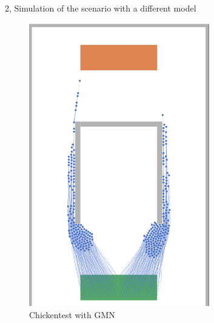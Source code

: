 \documentclass[10pt,a4paper]{article}
\begin{document}
\begin{task}{2, Simulation of the scenario with a different model}
\begin{itemize}
\begin{figure}[H]
        \includegraphics[width=0.7\textwidth]{pictures/gnm/chicken.png}
        \caption{Chickentest with GMN}
        \label{fig:chickentest_gnm}
    \end{figure}
\end{itemize}

\end{task}
\end{document}
